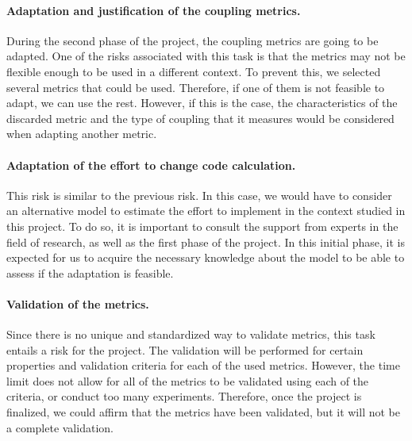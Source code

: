 \paragraph{Adaptation and justification of the coupling metrics.}
During the second phase of the project, the coupling metrics are going to be adapted. One of the risks associated with this task is that the metrics may not be flexible enough to be used in a different context.
To prevent this, we selected several metrics that could be used. Therefore, if one of them is not feasible to adapt, we can use the rest. However, if this is the case, the characteristics of the discarded metric and the type of coupling that it measures would be considered when adapting another metric.

\paragraph{Adaptation of the effort to change code calculation.}
This risk is similar to the previous risk. In this case, we would have to consider an alternative model to estimate the effort to implement in the context studied in this project. To do so, it is important to consult the support from experts in the field of research, as well as the first phase of the project. In this initial phase, it is expected for us to acquire the necessary knowledge about the model to be able to assess if the adaptation is feasible.

\paragraph{Validation of the metrics.}
Since there is no unique and standardized way to validate metrics, this task entails a risk for the project. The validation will be performed for certain properties and validation criteria for each of the used metrics. However, the time limit does not allow for all of the metrics to be validated using each of the criteria, or conduct too many experiments. Therefore, once the project is finalized, we could affirm that the metrics have been validated, but it will not be a complete validation.

